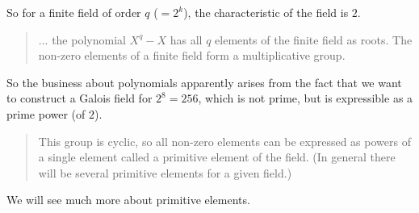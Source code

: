 \documentclass[11pt, oneside]{article}
\begin{document}
So for a finite field of order $q$ ($= 2^k$), the characteristic of the field is $2$.

\begin{quote}... the polynomial $X^q-X$ has all $q$ elements of the finite field as roots. The non-zero elements of a finite field form a multiplicative group.\end{quote}

So the business about polynomials apparently arises from the fact that we want to construct a Galois field for $2^8 = 256$, which is not prime, but is expressible as a prime power (of $2$).

\begin{quote}This group is cyclic, so all non-zero elements can be expressed as powers of a single element called a primitive element of the field. (In general there will be several primitive elements for a given field.)
\end{quote}

We will see much more about primitive elements.
\end{document}

